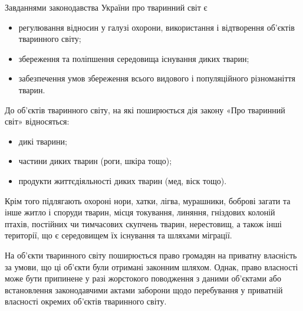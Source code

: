 \documentclass[a4paper,oneside,DIV=10,12pt]{scrreprt}
\begin{document}
			Завданнями законодавства України про тваринний світ є
			\begin{itemize}
				\item регулювання відносин у галузі охорони, використання і відтворення об'єктів тваринного світу;
				\item збереження та поліпшення середовища існування диких тварин;
				\item забезпечення умов збереження всього видового і популяційного різноманіття тварин.
			\end{itemize}
			
			До об'єктів тваринного світу, на які поширюється дія закону «Про тваринний світ» відносяться:
			\begin{itemize}
				\item дикі тварини;
				\item частини диких тварин (роги, шкіра тощо);
				\item продукти життєдіяльності диких тварин (мед, віск тощо).
			\end{itemize}
			
			Крім того підлягають охороні нори, хатки, лігва, мурашники, боброві загати та інше житло і споруди тварин, місця токування, линяння, гніздових колоній птахів, постійних чи тимчасових скупчень тварин, нерестовищ, а також інші території, що є середовищем їх існування та шляхами міграції.
			
			На об'єкти тваринного світу поширюється право громадян на приватну власність за умови, що ці об'єкти були отримані законним шляхом. Однак, право власності може бути припинене у разі жорстокого поводження з даними об'єктами або встановлення законодавчими актами заборони щодо перебування у приватній власності окремих об'єктів тваринного світу.
			
\end{document}
